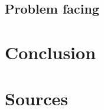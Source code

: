 \documentclass[a4paper, 12pt]{report}
\begin{document}
\section{Problem facing}

\chapter{Conclusion}

\chapter{Sources}
\end{document}
